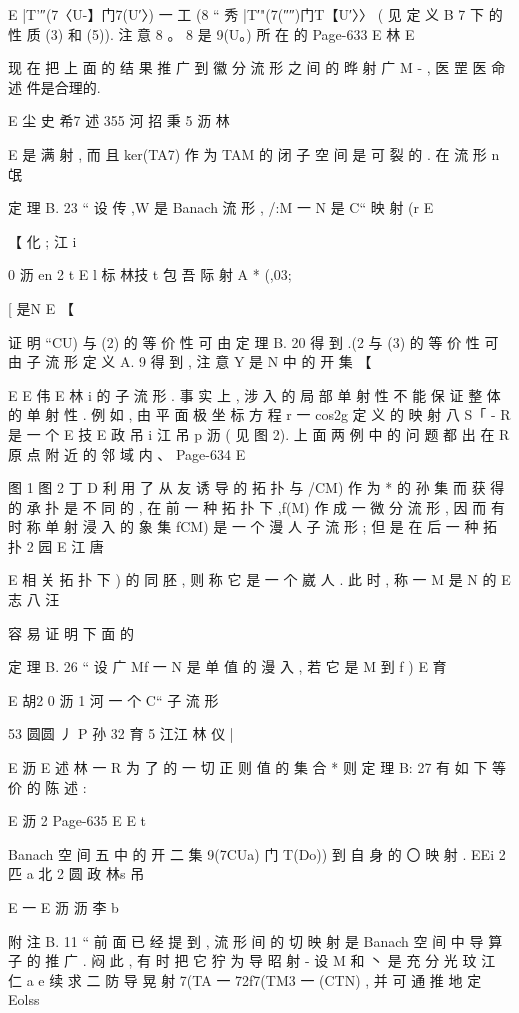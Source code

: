 E |T'″(7〈U-】门7(U′〉) 一 工 (8 “ 秀 |T′"(7(″″)门T【U′〉〉
( 见 定 义 B 7 下 的 性 质 (3) 和 (5)). 注 意 8 。 8 是 9(U。) 所 在 的
Page-633
E 林 E

现 在 把 上 面 的 结 果 推 广 到 徽 分 流 形 之 间 的 晔 射 广 M - ,
医 罡 医 命 述
件是合理的.

E 尘 史 希7 述 355 河 招 秉 5
沥 林

E
是 满 射 , 而 且 ker(TA7) 作 为 TAM 的 闭 子 空 间 是 可 裂 的 . 在 流 形
n
氓

定 理 B. 23 “ 设 传 ,W 是 Banach 流 形 , /:M 一 N 是 C“ 映 射 (r
E

【 化 ; 江 i

0 沥 en 2 t
E l 标 林技 t
包 吾 际 射 A * (,03;

[ 是N E
【

证 明 “CU) 与 (2) 的 等 价 性 可 由 定 理 B. 20 得 到 .(2 与 (3) 的
等 价 性 可 由 子 流 形 定 义 A. 9 得 到 , 注 意 Y 是 N 中 的 开 集 【

E
E 伟
E 林 i
的 子 流 形 . 事 实 上 , 涉 入 的 局 部 单 射 性 不 能 保 证 整 体 的 单 射 性 .
例 如 , 由 平 面 极 坐 标 方 程 r 一 cos2g 定 义 的 映 射 八 S「 - R 是 一 个
E 技
E 政 吊
i 江 吊 p 沥
( 见 图 2). 上 面 两 例 中 的 问 题 都 出 在 R 原 点 附 近 的 邻 域 内 、
Page-634
E

图 1 图 2
丁 D 利 用 了 从 友 诱 导 的 拓 扑 与 /CM) 作 为 * 的 孙 集 而 获 得 的 承
扑 是 不 同 的 , 在 前 一 种 拓 扑 下 ,f(M) 作 成 一 微 分 流 形 , 因 而 有 时
称 单 射 浸 入 的 象 集 fCM) 是 一 个 漫 人 子 流 形 ; 但 是 在 后 一 种 拓 扑
2 园
E 江 唐

E
相 关 拓 扑 下 ) 的 同 胚 , 则 称 它 是 一 个 崴 人 . 此 时 , 称 一 M 是 N 的
E 志 八 汪

容 易 证 明 下 面 的

定 理 B. 26 “ 设 广 Mf 一 N 是 单 值 的 漫 入 , 若 它 是 M 到 f )
E 育

E 胡2
0 沥 1 河
一 个 C“ 子 流 形

53 圆圆 丿 P 孙 32 育 5 江江 林 仪 |

E 沥
E 述 林 一
R 为 了 的 一 切 正 则 值 的 集 合 * 则 定 理 B: 27 有 如 下 等 价 的 陈 述 :

E 沥 2
Page-635
E E t

Banach 空 间 五 中 的 开 二 集 9(7CUa) 门 T(Do)) 到 自 身 的 〇 映 射 .
EEi 2 匹 a 北 2 圆 政 林s 吊

E 一
E 沥 沥 李 b

附 注 B. 11 “ 前 面 已 经 提 到 , 流 形 间 的 切 映 射 是 Banach 空 间
中 导 算 子 的 推 广 . 闷 此 , 有 时 把 它 狞 为 导 昭 射 - 设 M 和 丶 是 充 分 光
玟
江 仁 a e
续 求 二 防 导 晃 射 7(TA 一 72f7(TM3 一 (CTN) , 并 可 通 推 地 定
Eolss

